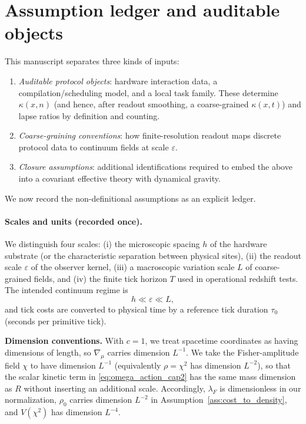 \section{Assumption ledger and auditable objects}
\label{sec:assumption_ledger}

This manuscript separates three kinds of inputs:
\begin{enumerate}
  \item \emph{Auditable protocol objects}: hardware interaction data, a compilation/scheduling model, and a local task family. These determine $\kappa(x,n)$ (and hence, after readout smoothing, a coarse-grained $\kappa(x,t)$) and lapse ratios by definition and counting.
  \item \emph{Coarse-graining conventions}: how finite-resolution readout maps discrete protocol data to continuum fields at scale $\varepsilon$.
  \item \emph{Closure assumptions}: additional identifications required to embed the above into a covariant effective theory with dynamical gravity.
\end{enumerate}
We now record the non-definitional assumptions as an explicit ledger.

\paragraph{Scales and units (recorded once).}
We distinguish four scales:
(i) the microscopic spacing $h$ of the hardware substrate (or the characteristic separation between physical sites),
(ii) the readout scale $\varepsilon$ of the observer kernel,
(iii) a macroscopic variation scale $L$ of coarse-grained fields, and
(iv) the finite tick horizon $T$ used in operational redshift tests.
The intended continuum regime is
\begin{equation}
  h \ll \varepsilon \ll L,
  \label{eq:scale_separation_ledger}
\end{equation}
and tick costs are converted to physical time by a reference tick duration $\tau_0$ (seconds per primitive tick).
\par
\noindent\textbf{Dimension conventions.}
With $c=1$, we treat spacetime coordinates as having dimensions of length, so $\nabla_\mu$ carries dimension $L^{-1}$.
We take the Fisher-amplitude field $\chi$ to have dimension $L^{-1}$ (equivalently $\rho=\chi^2$ has dimension $L^{-2}$), so that the scalar kinetic term in \eqref{eq:omega_action_cap2} has the same mass dimension as $R$ without inserting an additional scale.
Accordingly, $\lambda_F$ is dimensionless in our normalization, $\rho_0$ carries dimension $L^{-2}$ in Assumption~\ref{ass:cost_to_density}, and $V(\chi^2)$ has dimension $L^{-4}$.

